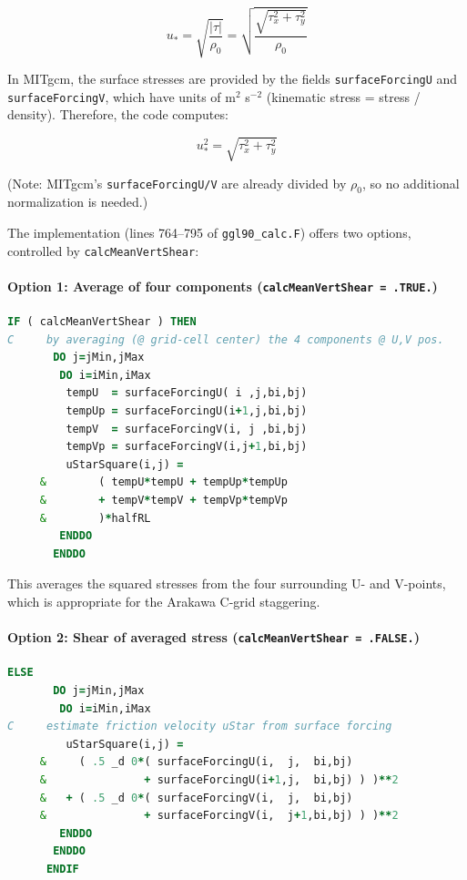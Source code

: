 \documentclass[12pt,letterpaper]{article}
\begin{document}
\begin{equation}
u_* = \sqrt{\frac{|\tau|}{\rho_0}} = \sqrt{\frac{\sqrt{\tau_x^2 + \tau_y^2}}{\rho_0}}
\label{eq:ustar_definition}
\end{equation}

In MITgcm, the surface stresses are provided by the fields \verb|surfaceForcingU| and \verb|surfaceForcingV|, which have units of m$^2$ s$^{-2}$ (kinematic stress = stress / density). Therefore, the code computes:

\begin{equation}
u_*^2 = \sqrt{\tau_x^2 + \tau_y^2}
\label{eq:ustar_squared}
\end{equation}

(Note: MITgcm's \verb|surfaceForcingU/V| are already divided by $\rho_0$, so no additional normalization is needed.)

The implementation (lines 764--795 of \verb|ggl90_calc.F|) offers two options, controlled by \verb|calcMeanVertShear|:

\paragraph{Option 1: Average of four components (\texttt{calcMeanVertShear = .TRUE.})}

\begin{lstlisting}[language=Fortran,caption={(ggl90\_calc.F:L764--783) Surface friction velocity: Option 1}]
      IF ( calcMeanVertShear ) THEN
C     by averaging (@ grid-cell center) the 4 components @ U,V pos.
       DO j=jMin,jMax
        DO i=iMin,iMax
         tempU  = surfaceForcingU( i ,j,bi,bj)
         tempUp = surfaceForcingU(i+1,j,bi,bj)
         tempV  = surfaceForcingV(i, j ,bi,bj)
         tempVp = surfaceForcingV(i,j+1,bi,bj)
         uStarSquare(i,j) =
     &        ( tempU*tempU + tempUp*tempUp
     &        + tempV*tempV + tempVp*tempVp
     &        )*halfRL
        ENDDO
       ENDDO
\end{lstlisting}

This averages the squared stresses from the four surrounding U- and V-points, which is appropriate for the Arakawa C-grid staggering.

\paragraph{Option 2: Shear of averaged stress (\texttt{calcMeanVertShear = .FALSE.})}

\begin{lstlisting}[language=Fortran,caption={(ggl90\_calc.F:L784--795) Surface friction velocity: Option 2}]
      ELSE
       DO j=jMin,jMax
        DO i=iMin,iMax
C     estimate friction velocity uStar from surface forcing
         uStarSquare(i,j) =
     &     ( .5 _d 0*( surfaceForcingU(i,  j,  bi,bj)
     &               + surfaceForcingU(i+1,j,  bi,bj) ) )**2
     &   + ( .5 _d 0*( surfaceForcingV(i,  j,  bi,bj)
     &               + surfaceForcingV(i,  j+1,bi,bj) ) )**2
        ENDDO
       ENDDO
      ENDIF
\end{lstlisting}
\end{document}
